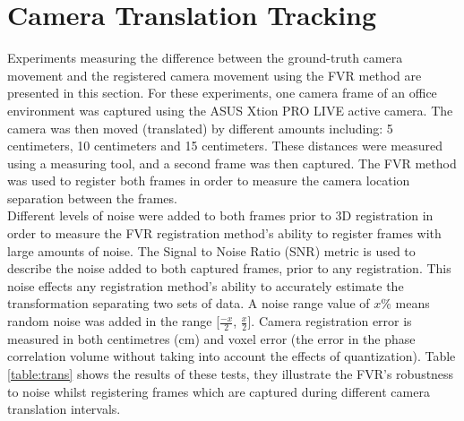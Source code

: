 \section{Camera Translation Tracking}
\label{Sec:CamTransTrackExp}

Experiments measuring the difference between the ground-truth camera movement and the registered camera movement using the FVR method are presented in this section. For these experiments, one camera frame of an office environment was captured using the ASUS Xtion PRO LIVE active camera. The camera was then moved (translated) by different amounts including: 5 centimeters, 10 centimeters and 15 centimeters. These distances were measured using a measuring tool, and a second frame was then captured. The FVR method was used to register both frames in order to measure the camera location separation between the frames. \\

Different levels of noise were added to both frames prior to 3D registration in order to measure the FVR registration method's ability to register frames with large amounts of noise. The Signal to Noise Ratio (SNR) metric is used to describe the noise added to both captured frames, prior to any registration. This noise effects any registration method's ability to accurately estimate the transformation separating two sets of data. A noise range value of $x$\% means random noise was added in the range [$\frac{-x}{2}$, $\frac{x}{2}$]. Camera registration error is measured in both centimetres (cm) and voxel error (the error in the phase correlation volume without taking into account the effects of quantization). Table \ref{table:trans} shows the results of these tests, they illustrate the FVR's robustness to noise whilst registering frames which are captured during different camera translation intervals. \\

